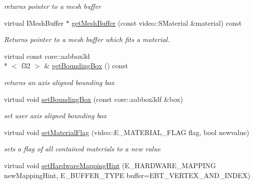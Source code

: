 \begin{DoxyCompactItemize}
\begin{DoxyCompactList}\small\item\em returns pointer to a mesh buffer \end{DoxyCompactList}\item 
virtual I\-Mesh\-Buffer $\ast$ \hyperlink{classirr_1_1scene_1_1_c_animated_mesh_m_d2_aca1f61f1f1719c78a3b78b87eb319aa3}{get\-Mesh\-Buffer} (const video\-::\-S\-Material \&material) const 
\begin{DoxyCompactList}\small\item\em Returns pointer to a mesh buffer which fits a material. \end{DoxyCompactList}\item 
\hypertarget{classirr_1_1scene_1_1_c_animated_mesh_m_d2_a5e648e695103ace6eaed5f0f71473bda}{virtual const core\-::aabbox3d\\*
$<$ f32 $>$ \& \hyperlink{classirr_1_1scene_1_1_c_animated_mesh_m_d2_a5e648e695103ace6eaed5f0f71473bda}{get\-Bounding\-Box} () const }\label{classirr_1_1scene_1_1_c_animated_mesh_m_d2_a5e648e695103ace6eaed5f0f71473bda}

\begin{DoxyCompactList}\small\item\em returns an axis aligned bounding box \end{DoxyCompactList}\item 
\hypertarget{classirr_1_1scene_1_1_c_animated_mesh_m_d2_acc17ade8a81f6bf0aac081fdb0d1ead5}{virtual void \hyperlink{classirr_1_1scene_1_1_c_animated_mesh_m_d2_acc17ade8a81f6bf0aac081fdb0d1ead5}{set\-Bounding\-Box} (const core\-::aabbox3df \&box)}\label{classirr_1_1scene_1_1_c_animated_mesh_m_d2_acc17ade8a81f6bf0aac081fdb0d1ead5}

\begin{DoxyCompactList}\small\item\em set user axis aligned bounding box \end{DoxyCompactList}\item 
\hypertarget{classirr_1_1scene_1_1_c_animated_mesh_m_d2_a81c1d38d3ea495242ee622e19565c1cf}{virtual void \hyperlink{classirr_1_1scene_1_1_c_animated_mesh_m_d2_a81c1d38d3ea495242ee622e19565c1cf}{set\-Material\-Flag} (video\-::\-E\-\_\-\-M\-A\-T\-E\-R\-I\-A\-L\-\_\-\-F\-L\-A\-G flag, bool newvalue)}\label{classirr_1_1scene_1_1_c_animated_mesh_m_d2_a81c1d38d3ea495242ee622e19565c1cf}

\begin{DoxyCompactList}\small\item\em sets a flag of all contained materials to a new value \end{DoxyCompactList}\item 
\hypertarget{classirr_1_1scene_1_1_c_animated_mesh_m_d2_aa9ede736bbb70176733a10c2af42417e}{virtual void \hyperlink{classirr_1_1scene_1_1_c_animated_mesh_m_d2_aa9ede736bbb70176733a10c2af42417e}{set\-Hardware\-Mapping\-Hint} (E\-\_\-\-H\-A\-R\-D\-W\-A\-R\-E\-\_\-\-M\-A\-P\-P\-I\-N\-G new\-Mapping\-Hint, E\-\_\-\-B\-U\-F\-F\-E\-R\-\_\-\-T\-Y\-P\-E buffer=E\-B\-T\-\_\-\-V\-E\-R\-T\-E\-X\-\_\-\-A\-N\-D\-\_\-\-I\-N\-D\-E\-X)}\label{classirr_1_1scene_1_1_c_animated_mesh_m_d2_aa9ede736bbb70176733a10c2af42417e}


\end{DoxyCompactItemize}
